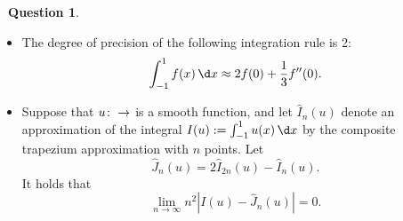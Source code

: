 \documentclass[10pt]{article}
\theoremstyle{definition}
\newtheorem{question}{{\normalfont \faGears}~Question}
\theoremstyle{remark}
\begin{document}
\begin{question}
\begin{enumerate}
\begin{itemize}
                \item
                    The degree of precision of the following integration rule is 2:
                    \[
                        \int_{-1}^{1} f(x) \, \d x \approx
                        2 f(0) + \frac{1}{3} f''(0).
                    \]

                \item
                    Suppose that $u \colon \real \to \real$ is a smooth function,
                    and let $\widehat I_n(u)$ denote an approximation of
                    the integral $I(u) := \int_{-1}^{1} u(x) \, \d x$
                    by the composite trapezium approximation with $n$ points.
                    Let
                    \[
                        \widehat J_n(u) = 2 \widehat I_{2n}(u) - \widehat I_n(u).
                    \]
                    It holds that
                    \[
                        \lim_{n \to \infty} n^2 \left\lvert I(u) - \widehat J_n(u) \right\rvert
                        = 0.
                    \]
            \end{itemize}

    \end{enumerate}
\end{question}
\end{document}
